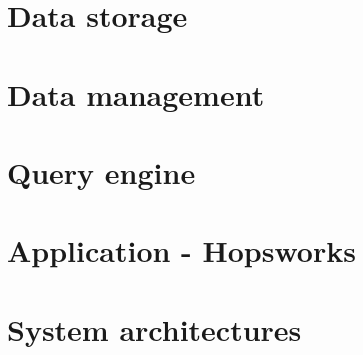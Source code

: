 

\section{Data storage}
    \label{sec:back_data_storage}
    

\section{Data management}
    \label{sec:back_data_management}
    

\section{Query engine}
    \label{sec:back_query_engine}
    

\section{Application - Hopsworks}
    \label{sec:back_applications}
    

\section{System architectures}
    \label{sec:back_system_architecture}
    